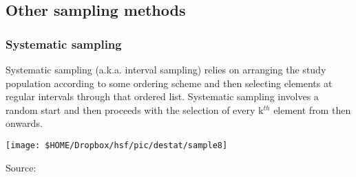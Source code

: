 {%
}

\subsection{Other sampling methods}


\subsubsection{Systematic sampling}
Systematic sampling (a.k.a. interval sampling) relies on arranging the study population according to some ordering scheme and then selecting elements at regular intervals through that ordered list. Systematic sampling involves a random start and then proceeds with the selection of every k$^{th}$ element from then onwards. 
\begin{center}\texttt{[image: \$HOME/Dropbox/hsf/pic/destat/sample8]}
	
	Source: \citet[p. 92]{Gonick1993Cartoon}\end{center}


